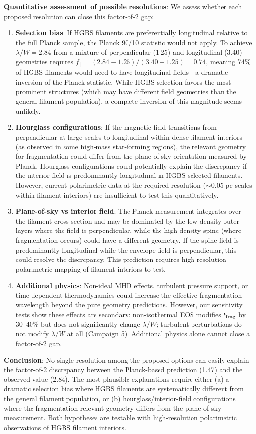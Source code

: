 \documentclass[twoside,twocolumn]{mnras}
\begin{document}
\textbf{Quantitative assessment of possible resolutions}: We assess whether each proposed resolution can close this factor-of-2 gap:
\begin{enumerate}
    \item \textbf{Selection bias}: If HGBS filaments are preferentially longitudinal relative to the full Planck sample, the Planck 90/10 statistic would not apply. To achieve $\lambda/W = 2.84$ from a mixture of perpendicular (1.25) and longitudinal (3.40) geometries requires $f_{\parallel} = (2.84 - 1.25)/(3.40 - 1.25) = 0.74$, meaning 74\% of HGBS filaments would need to have longitudinal fields---a dramatic inversion of the Planck statistic. While HGBS selection favors the most prominent structures (which may have different field geometries than the general filament population), a complete inversion of this magnitude seems unlikely.
    \item \textbf{Hourglass configurations}: If the magnetic field transitions from perpendicular at large scales to longitudinal within dense filament interiors (as observed in some high-mass star-forming regions), the relevant geometry for fragmentation could differ from the plane-of-sky orientation measured by Planck. Hourglass configurations could potentially explain the discrepancy if the interior field is predominantly longitudinal in HGBS-selected filaments. However, current polarimetric data at the required resolution ($\sim$0.05 pc scales within filament interiors) are insufficient to test this quantitatively.
    \item \textbf{Plane-of-sky vs interior field}: The Planck measurement integrates over the filament cross-section and may be dominated by the low-density outer layers where the field is perpendicular, while the high-density spine (where fragmentation occurs) could have a different geometry. If the spine field is predominantly longitudinal while the envelope field is perpendicular, this could resolve the discrepancy. This prediction requires high-resolution polarimetric mapping of filament interiors to test.
    \item \textbf{Additional physics}: Non-ideal MHD effects, turbulent pressure support, or time-dependent thermodynamics could increase the effective fragmentation wavelength beyond the pure geometry predictions. However, our sensitivity tests show these effects are secondary: non-isothermal EOS modifies $t_{\rm frag}$ by 30--40\% but does not significantly change $\lambda/W$; turbulent perturbations do not modify $\lambda/W$ at all (Campaign 5). Additional physics alone cannot close a factor-of-2 gap.
\end{enumerate}
\textbf{Conclusion}: No single resolution among the proposed options can easily explain the factor-of-2 discrepancy between the Planck-based prediction (1.47) and the observed value (2.84). The most plausible explanations require either (a) a dramatic selection bias where HGBS filaments are systematically different from the general filament population, or (b) hourglass/interior-field configurations where the fragmentation-relevant geometry differs from the plane-of-sky measurement. Both hypotheses are testable with high-resolution polarimetric observations of HGBS filament interiors.
\end{document}
